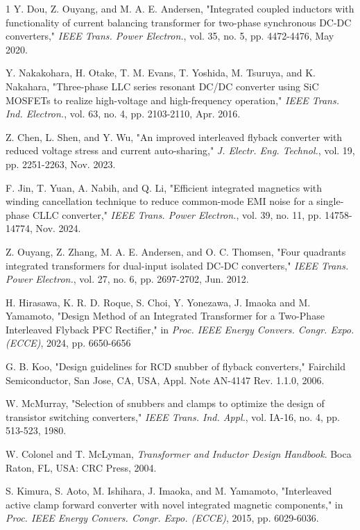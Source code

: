 \documentclass[lettersize,journal]{IEEEtran}
\begin{document}
\begin{thebibliography}{1}
Y. Dou, Z. Ouyang, and M. A. E. Andersen, "Integrated coupled inductors with functionality of current balancing transformer for two-phase synchronous DC-DC converters," \textit{IEEE Trans. Power Electron.}, vol. 35, no. 5, pp. 4472-4476, May 2020.

Y. Nakakohara, H. Otake, T. M. Evans, T. Yoshida, M. Tsuruya, and K. Nakahara, "Three-phase LLC series resonant DC/DC converter using SiC MOSFETs to realize high-voltage and high-frequency operation," \textit{IEEE Trans. Ind. Electron.}, vol. 63, no. 4, pp. 2103-2110, Apr. 2016.

Z. Chen, L. Shen, and Y. Wu, "An improved interleaved flyback converter with reduced voltage stress and current auto-sharing," \textit{J. Electr. Eng. Technol.}, vol. 19, pp. 2251-2263, Nov. 2023.

F. Jin, T. Yuan, A. Nabih, and Q. Li, "Efficient integrated magnetics with winding cancellation technique to reduce common-mode EMI noise for a single-phase CLLC converter," \textit{IEEE Trans. Power Electron.}, vol. 39, no. 11, pp. 14758-14774, Nov. 2024.

Z. Ouyang, Z. Zhang, M. A. E. Andersen, and O. C. Thomsen, "Four quadrants integrated transformers for dual-input isolated DC-DC converters," \textit{IEEE Trans. Power Electron.}, vol. 27, no. 6, pp. 2697-2702, Jun. 2012.

H. Hirasawa, K. R. D. Roque, S. Choi, Y. Yonezawa, J. Imaoka and M. Yamamoto, "Design Method of an Integrated Transformer for a Two-Phase Interleaved Flyback PFC Rectifier," in \textit{Proc. IEEE Energy Convers. Congr. Expo. (ECCE)}, 2024, pp. 6650-6656

G. B. Koo, "Design guidelines for RCD snubber of flyback converters," Fairchild Semiconductor, San Jose, CA, USA, Appl. Note AN-4147 Rev. 1.1.0, 2006.

W. McMurray, "Selection of snubbers and clamps to optimize the design of transistor switching converters," \textit{IEEE Trans. Ind. Appl.}, vol. IA-16, no. 4, pp. 513-523, 1980.

W. Colonel and T. McLyman, \textit{Transformer and Inductor Design Handbook}. Boca Raton, FL, USA: CRC Press, 2004.

S. Kimura, S. Aoto, M. Ishihara, J. Imaoka, and M. Yamamoto, "Interleaved active clamp forward converter with novel integrated magnetic components," in \textit{Proc. IEEE Energy Convers. Congr. Expo. (ECCE)}, 2015, pp. 6029-6036.

\end{thebibliography}
\end{document}
